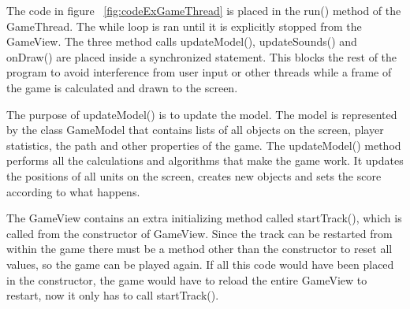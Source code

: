 The code in figure ~\ref{fig:codeExGameThread} is placed in the run() method of the GameThread. The while loop is ran until it is explicitly stopped from the GameView. The three method calls updateModel(), updateSounds() and onDraw() are placed inside a synchronized statement. This blocks the rest of the program to avoid interference from user input or other threads while a frame of the game is calculated and drawn to the screen. 

The purpose of updateModel() is to update the model. The model is represented by the class GameModel that contains lists of all objects on the screen, player statistics, the path and other properties of the game. The updateModel() method performs all the calculations and algorithms that make the game work. It updates the positions of all units on the screen, creates new objects and sets the score according to what happens. 

The GameView contains an extra initializing method called startTrack(), which is called from the constructor of GameView. Since the track can be restarted from within the game there must be a method other than the constructor to reset all values, so the game can be played again. If all this code would have been placed in the constructor, the game would have to reload the entire GameView to restart, now it only has to call startTrack().